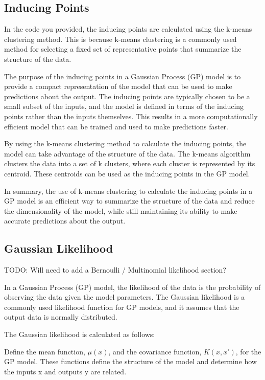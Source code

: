\documentclass[12pt,a4paper]{report}
\begin{document}
\subsection{Inducing Points}

In the code you provided, the inducing points are calculated using the k-means clustering method. 
This is because k-means clustering is a commonly used method for selecting a fixed set of representative points that summarize the structure of the data.

The purpose of the inducing points in a Gaussian Process (GP) model is to provide a compact representation of the model that can be used to make predictions about the output. 
The inducing points are typically chosen to be a small subset of the inputs, and the model is defined in terms of the inducing points rather than the inputs themselves. 
This results in a more computationally efficient model that can be trained and used to make predictions faster.

By using the k-means clustering method to calculate the inducing points, the model can take advantage of the structure of the data. 
The k-means algorithm clusters the data into a set of k clusters, where each cluster is represented by its centroid. 
These centroids can be used as the inducing points in the GP model.

In summary, the use of k-means clustering to calculate the inducing points in a GP model is an efficient way to summarize the structure of the data and reduce the dimensionality of the model, while still maintaining its ability to make accurate predictions about the output.

\subsection{Gaussian Likelihood}

TODO: Will need to add a Bernoulli / Multinomial likelihood section?

In a Gaussian Process (GP) model, the likelihood of the data is the probability of observing the data given the model parameters. 
The Gaussian likelihood is a commonly used likelihood function for GP models, and it assumes that the output data is normally distributed.

The Gaussian likelihood is calculated as follows:

Define the mean function, $\mu(x)$, and the covariance function, $K(x, x')$, for the GP model. 
These functions define the structure of the model and determine how the inputs x and outputs y are related.
\end{document}
